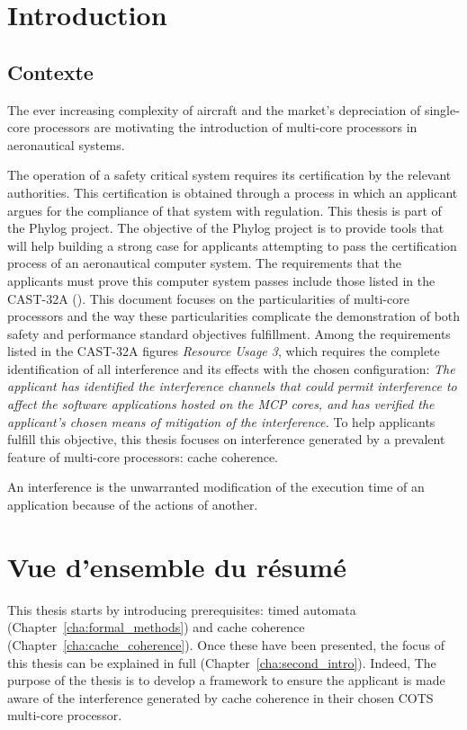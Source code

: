 \section{Introduction}
\subsection{Contexte}
The ever increasing complexity of aircraft and the market's depreciation of
single-core processors are motivating the introduction of multi-core processors
in aeronautical systems.

The operation of a safety critical system requires its certification by the
relevant authorities. This certification is obtained through a process in which
an applicant argues for the compliance of that system with regulation. This
thesis is part of the Phylog project. The objective of the Phylog project
is to provide tools that will help building a strong case for applicants
attempting to pass the certification process of an aeronautical computer system.
The requirements that the applicants must prove this computer system passes
include those listed in the CAST-32A (\cite{cast32}). This document focuses on
the particularities of multi-core processors and the way these particularities
complicate the demonstration of both safety and performance standard objectives
fulfillment. Among the requirements listed in the CAST-32A figures
\textit{Resource Usage 3}, which requires the complete identification of all
interference and its effects with the chosen configuration: \textit{The
applicant has identified the interference channels that could permit
interference to affect the software applications hosted on the MCP cores, and
has verified the applicant's chosen means of mitigation of the interference.}
To help applicants fulfill this objective, this
thesis focuses on interference generated by a prevalent feature of multi-core
processors: cache coherence.

\begin{definition}[Interference]
An interference is the unwarranted modification of the execution time of an
application because of the actions of another.
\end{definition}

\section{Vue d'ensemble du r\'esum\'e}
This thesis starts by introducing prerequisites: timed automata
(Chapter~\ref{cha:formal_methods}) and cache
coherence (Chapter~\ref{cha:cache_coherence}).
Once these have
been presented, the focus of this thesis can be explained in full
(Chapter~\ref{cha:second_intro}).
Indeed, The purpose of the thesis is to
develop a framework to ensure the applicant is made aware of the interference
generated by cache coherence in their chosen COTS multi-core processor.

